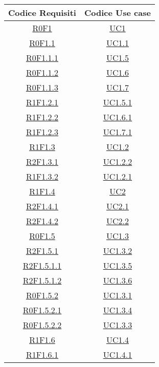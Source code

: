 \normalsize
\begin{longtable}{|c|c|}
\hline
\textbf{Codice Requisiti} & \textbf{Codice Use case} \\
\hline
\endhead
\hyperlink{R0F1}{R0F1} & \hyperlink{UC1}{UC1}\\
\hline
\hyperlink{R0F1.1}{R0F1.1} & \hyperlink{UC1.1}{UC1.1}\\
\hline
\hyperlink{R0F1.1.1}{R0F1.1.1} & \hyperlink{UC1.5}{UC1.5}\\
\hline
\hyperlink{R0F1.1.2}{R0F1.1.2} & \hyperlink{UC1.6}{UC1.6}\\
\hline
\hyperlink{R0F1.1.3}{R0F1.1.3} & \hyperlink{UC1.7}{UC1.7}\\
\hline
\hyperlink{R1F1.2.1}{R1F1.2.1} & \hyperlink{UC1.5.1}{UC1.5.1}\\
\hline
\hyperlink{R1F1.2.2}{R1F1.2.2} & \hyperlink{UC1.6.1}{UC1.6.1}\\
\hline
\hyperlink{R1F1.2.3}{R1F1.2.3} & \hyperlink{UC1.7.1}{UC1.7.1}\\
\hline
\hyperlink{R1F1.3}{R1F1.3} & \hyperlink{UC1.2}{UC1.2}\\
\hline
\hyperlink{R2F1.3.1}{R2F1.3.1} & \hyperlink{UC1.2.2}{UC1.2.2}\\
\hline
\hyperlink{R1F1.3.2}{R1F1.3.2} & \hyperlink{UC1.2.1}{UC1.2.1}\\
\hline
\hyperlink{R1F1.4}{R1F1.4} & \hyperlink{UC2}{UC2}\\
\hline
\hyperlink{R2F1.4.1}{R2F1.4.1} & \hyperlink{UC2.1}{UC2.1}\\
\hline
\hyperlink{R2F1.4.2}{R2F1.4.2} & \hyperlink{UC2.2}{UC2.2}\\
\hline
\hyperlink{R0F1.5}{R0F1.5} & \hyperlink{UC1.3}{UC1.3}\\
\hline
\hyperlink{R2F1.5.1}{R2F1.5.1} & \hyperlink{UC1.3.2}{UC1.3.2}\\
\hline
\hyperlink{R2F1.5.1.1}{R2F1.5.1.1} & \hyperlink{UC1.3.5}{UC1.3.5}\\
\hline
\hyperlink{R2F1.5.1.2}{R2F1.5.1.2} & \hyperlink{UC1.3.6}{UC1.3.6}\\
\hline
\hyperlink{R0F1.5.2}{R0F1.5.2} & \hyperlink{UC1.3.1}{UC1.3.1}\\
\hline
\hyperlink{R0F1.5.2.1}{R0F1.5.2.1} & \hyperlink{UC1.3.4}{UC1.3.4}\\
\hline
\hyperlink{R0F1.5.2.2}{R0F1.5.2.2} & \hyperlink{UC1.3.3}{UC1.3.3}\\
\hline
\hyperlink{R1F1.6}{R1F1.6} & \hyperlink{UC1.4}{UC1.4}\\
\hline
\hyperlink{R1F1.6.1}{R1F1.6.1} & \hyperlink{UC1.4.1}{UC1.4.1}\\

\end{longtable}
